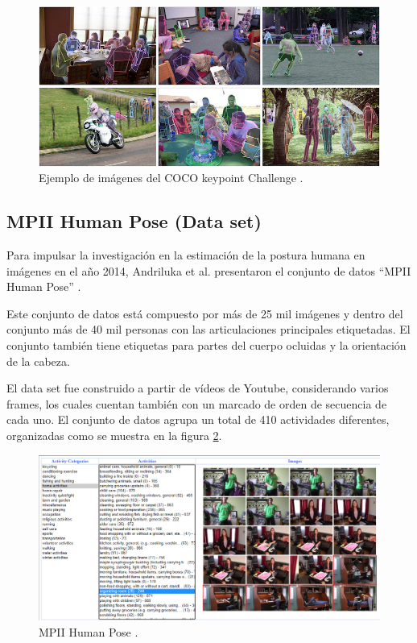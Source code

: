             \begin{figure}[ht!]
            	\centering
            	\includegraphics[width=0.8\linewidth]{imgs/02-Referential/02-coco-keypoints.png}
            	\caption[Ejemplo de imágenes del COCO keypoint Challenge]{Ejemplo de imágenes del COCO keypoint Challenge \cite{Coco2020KeyPointsHome}.}
        	    \label{fig:COCOKeyPointChallenge}
            \end{figure}%

    \subsection{MPII Human Pose (Data set)}
    \label{sub:FrameMPII}
        
        Para impulsar la investigación en la estimación de la postura humana en imágenes en el año 2014, Andriluka et al. presentaron el conjunto de datos ``MPII Human Pose'' \cite{MPII2014}.
        
        Este conjunto de datos está compuesto por más de 25 mil imágenes y dentro del conjunto más de 40 mil personas con las articulaciones principales etiquetadas. El conjunto también tiene etiquetas para partes del cuerpo ocluidas y la orientación de la cabeza.
        
        El data set fue construido a partir de vídeos de Youtube, considerando varios frames, los cuales cuentan también con un marcado de orden de secuencia de cada uno. El conjunto de datos agrupa un total de 410 actividades diferentes, organizadas como se muestra en la figura \ref{fig:MPII}.
        
        \begin{figure}[ht!]
        	\centering
        	\includegraphics[width=0.8\linewidth]{imgs/02-Referential/02-MPII.png}
        	\caption[MPII Human Pose]{MPII Human Pose \cite{MPII2014}.}
    	    \label{fig:MPII}
        \end{figure}%
    
